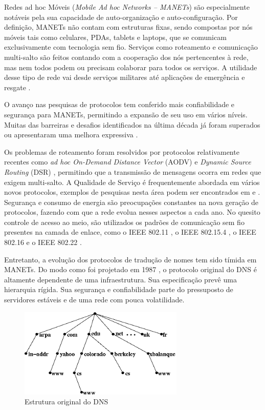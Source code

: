 \label{intro}

Redes ad hoc Móveis (\textit{Mobile Ad hoc Networks -- MANETs}) são especialmente notáveis pela sua capacidade
de auto-organização e auto-configuração. Por definição, MANETs não contam com
estruturas fixas, sendo compostas por nós móveis tais como celulares, PDAs,
tablets e laptops, que se comunicam exclusivamente com tecnologia sem fio. Serviços
como roteamento e comunicação multi-salto são feitos contando com a cooperação
dos nós pertencentes à rede, mas nem todos podem ou precisam colaborar para todos
os serviços. A utilidade desse tipo de rede vai desde serviços militares até aplicações
de emergência e resgate \cite{manet-def}.

O avanço nas pesquisas de protocolos tem conferido mais confiabilidade e segurança
para MANETs, permitindo a expansão de seu uso em vários níveis. Muitas das
barreiras e desafios identificados na última década já foram superados ou apresentaram
uma melhora expressiva \cite{manet-state}.

Os problemas de roteamento foram resolvidos por protocolos relativamente recentes
como \textit{ad hoc On-Demand Distance Vector} (AODV) \cite{aodv} e
\textit{Dynamic Source Routing} (DSR) \cite{dsr}, permitindo que a transmissão de
mensagens ocorra em redes que exigem multi-salto. A Qualidade de Serviço é
frequentemente abordada em vários novos protocolos, exemplos de pesquisas nesta
área podem ser encontrados em\cite{qos1} e \cite{qos2}. Segurança e consumo de
energia são preocupações constantes na nova geração de protocolos, fazendo com
que a rede evolua nesses aspectos a cada ano. No quesito controle de acesso ao
meio, são utilizados os padrões de comunicação sem fio presentes na camada de enlace,
como o IEEE 802.11 \cite{802-11}, o IEEE 802.15.4 \cite{802-15}, o IEEE 802.16
\cite{802-16} e o IEEE 802.22 \cite{802-22}.

Entretanto, a evolução dos protocolos de tradução de nomes tem sido tímida em MANETs. Do
modo como foi projetado em 1987 \cite{rfc1035}, o protocolo original do DNS é
altamente dependente de uma infraestrutura. Sua especificação prevê uma hierarquia rígida.
Sua segurança e confiabilidade parte do pressuposto de servidores estáveis e de
uma rede com pouca volatilidade.

\begin{figure}[h!]
    \centering
    \includegraphics[width=0.7\textwidth]{figures/dns-1}
    \caption{Estrutura original do DNS}
    \label{dns}
\end{figure}

